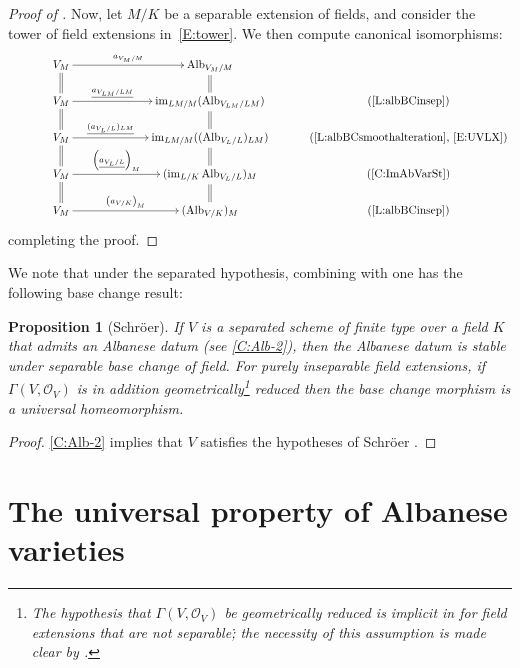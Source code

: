 \documentclass[11pt, reqno]{amsart}
\numberwithin{equation}{section}
\newtheorem{pro}[teo]{Proposition}
\theoremstyle{definition}
\theoremstyle{remark}
\DeclareMathOperator{\im}{im}
\newcommand{\ubar}[1]{{\underline{#1}}}
\DeclareMathOperator{\alb}{Alb}
\begin{document}
\begin{proof}[Proof of ]
 

   Now, let $M/K$ be a separable extension of fields, and consider the tower of field extensions in~\eqref{E:tower}.  
  We then compute canonical isomorphisms:
       \begin{equation*}
\xymatrix@C3em@R=1.5em{ 
&V_M \ar[rr]^<>(0.5){a_{V_M/M}}\ar@{=}[d]&& \operatorname{Alb}_{V_M/M} \ar@{=}[d]&\\
&V_M \ar[rr]^<>(0.5){\ubar {a_{V_{LM}/LM}}} \ar@{=}[d]&&\im_{LM/M}(\alb_{V_{LM}/LM}) \ar@{=}[d]& \text{(\Cref{L:albBCinsep})}\\
&V_M \ar[rr]^<>(0.5){\ubar{(a_{V_{L}/L})_{LM}}}\ar@{=}[d]&&\im_{LM/M}((\alb_{V_{L}/L})_{LM})  \ar@{=}[d]& \text{(\Cref{L:albBCsmoothalteration}, \eqref{E:UVLX})}\\
&V_M \ar[rr]^<>(0.5){\left(\ubar{a_{V_{L}/L}}\right)_{M}}\ar@{=}[d]&&(\im_{L/K}\alb_{V_{L}/L})_{M}  \ar@{=}[d]& \text{(\Cref{C:ImAbVarSt})}\\
&V_M \ar[rr]^<>(0.5){\left({a_{V/K}}\right)_{M}}&&( \alb_{V/K})_M   &  \text{(\Cref{L:albBCinsep})}
}
\end{equation*}
completing the proof.
 \end{proof}


We note that under the separated hypothesis, combining  with  \cite[Thm.~p.4]{schroeralbanese} one has the following base change result:

\begin{pro}[Schr\"oer] \label{P:Schroeer}
If $V$ is a separated scheme of finite type over a field $K$ that admits an Albanese datum (see  \ref{C:Alb-2}), then the Albanese datum is stable under separable base change of field.  For purely inseparable field extensions, if $\Gamma(V,\mathcal O_V)$ is in addition \emph{geometrically}\footnote{The hypothesis that 
$\Gamma(V,\mathcal O_V)$ be \emph{geometrically} reduced is implicit in \cite[Thm.~p.4]{schroeralbanese} for field extensions that are not separable\.; the necessity of this assumption is made clear by .}
 reduced then the base change morphism is a universal homeomorphism.
\end{pro}

\begin{proof}
\ref{C:Alb-2} implies that $V$ satisfies the hypotheses of 
 Schr\"oer  \cite[Thm.~p.4]{schroeralbanese}.
\end{proof}



\section{The universal property of Albanese varieties}
\label{S:univ}
\end{document}
